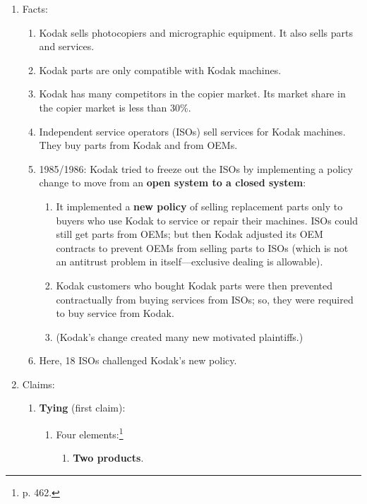 \begin{enumerate}
    \item Facts:
    \begin{enumerate}
        \item Kodak sells photocopiers and micrographic equipment. It also 
        sells parts and services.
        \item Kodak parts are only compatible with Kodak machines.
        \item Kodak has many competitors in the copier market. Its market 
        share in the copier market is less than 30\%.
        \item Independent service operators (ISOs) sell services for Kodak 
        machines. They buy parts from Kodak and from OEMs.
        \item 1985/1986: Kodak tried to freeze out the ISOs by implementing a 
        policy change to move from an \textbf{open system to a closed system}:
        \begin{enumerate}
            \item It implemented a \textbf{new policy} of selling replacement 
            parts only to buyers who use Kodak to service or repair their 
            machines.  ISOs could still get parts from OEMs; but then Kodak 
            adjusted its OEM contracts to prevent OEMs from selling parts to 
            ISOs (which is not an antitrust problem in itself---exclusive 
            dealing is allowable).
            \item Kodak customers who bought Kodak parts were then prevented 
            contractually from buying services from ISOs; so, they were 
            required to buy service from Kodak.
            \item (Kodak's change created many new motivated plaintiffs.)
        \end{enumerate}
        \item Here, 18 ISOs challenged Kodak's new policy.
    \end{enumerate}
    \item Claims:
    \begin{enumerate}
        \item \textbf{Tying} (first claim):
        \begin{enumerate}
            \item Four elements:\footnote{p. 462.}
            \begin{enumerate}
                \item \textbf{Two products}.
                \begin{itemize}

\end{itemize}
\end{enumerate}
\end{enumerate}
\end{enumerate}
\end{enumerate}
